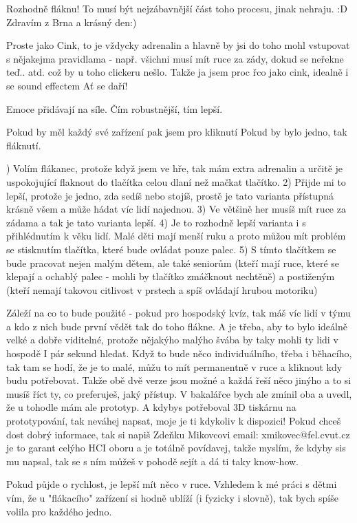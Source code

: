 \begtt
Rozhodně fláknu! To musí být nejzábavnější část toho procesu,
jinak nehraju. :D Zdravím z Brna a krásný den:)
\endtt

\begtt
Proste jako Cink, to je vždycky adrenalin a hlavně by jsi do toho
mohl vstupovat s nějakejma pravidlama - např. všichni musí mít ruce
za zády, dokud se neřekne teď.. atd. což by u toho clickeru nešlo.
Takže ja jsem proc řco jako cink, idealně i se sound effectem
Ať se daří! 
\endtt

\begtt
Emoce přidávají na síle. Čím robustnější, tím lepší.
\endtt

\begtt
Pokud by měl každý své zařízení pak jsem pro kliknutí
Pokud by bylo jedno, tak fláknutí.
\endtt

) Volím flákanec, protože když jsem ve hře, tak mám
extra adrenalin a určitě je uspokojující flaknout do tlačítka
celou dlaní než mačkat tlačítko.
2) Přijde mi to lepší, protože je jedno, zda sedíš nebo stojíš,
prostě je tato varianta přístupná krásně všem a může hádat víc
lidí najednou.
3) Ve většině her musíš mít ruce za zádama a tak je tato
varianta lepší. 
4) Je to rozhodně lepší varianta i s přihlédnutím k věku lidí.
Malé děti mají menší ruku a proto můžou mít problém se
stisknutím tlačítka, které bude ovládat pouze palec.
5) S tímto tlačítkem se bude pracovat nejen malým dětem,
ale také seniorům (kteří mají ruce, které se klepají a ochablý
palec - mohli by tlačítko zmáčknout nechtěně) a postiženým
(kteří nemají takovou citlivost v prstech a spíš ovládají
hrubou motoriku)
\endtt

\begtt
Záleží na co to bude použité - pokud pro hospodský kvíz,
tak máš víc lidí v týmu a kdo z nich bude první vědět tak
do toho flákne. A je třeba, aby to bylo ideálně velké
a dobře viditelné, protože nějakýho malýho švába by taky
mohli ty lidi v hospodě I pár sekund hledat. 
Když to bude něco individuálního, třeba i běhacího, tak
tam se hodí, že je to malé, můžu to mít permanentně
v ruce a kliknout kdy budu potřebovat.
Takže obě dvě verze jsou možné a každá řeší něco jinýho
a to si musíš říct ty, co preferuješ, jaký přístup. V bakalářce
bych ale zmínil oba a uvedl, že u tohodle mám ale prototyp.
A kdybys potřeboval 3D tiskárnu na prototypování, tak neváhej
napsat, moje je ti kdykoliv k dispozici! 
Pokud chceš dost dobrý informace, tak si napiš Zdeňku Mikovcovi
email: xmikovec@fel.cvut.cz je to garant celýho HCI oboru
a je totálně povídavej, takže myslím, že kdyby sis mu napsal,
tak se s ním můžeš v pohodě sejít a dá ti taky know-how.
\endtt

\begtt
Pokud půjde o rychlost, je lepší mít něco v ruce. Vzhledem
k mé práci s dětmi vím, že u "flákacího" zařízení si hodně
ublíží (i fyzicky i slovně), tak bych spíše volila
pro každého jedno. 
\endtt

